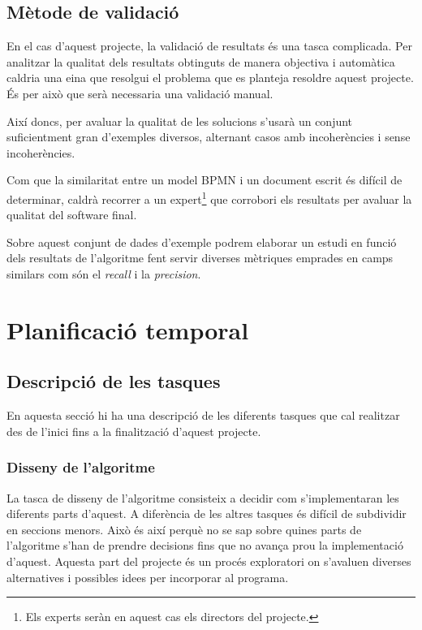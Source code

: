 \documentclass[10pt,a4paper]{article}
\begin{document}
\subsection{Mètode de validació}

En el cas d'aquest projecte, la validació de resultats és una tasca complicada. Per analitzar la qualitat dels resultats obtinguts de manera objectiva i automàtica caldria una eina que resolgui el problema que es planteja resoldre aquest projecte. És per això que serà necessaria una validació manual.

Així doncs, per avaluar la qualitat de les solucions s'usarà un conjunt suficientment gran d'exemples diversos, alternant casos amb incoherències i sense incoherències. 

Com que la similaritat entre un model BPMN i un document escrit és difícil de determinar, caldrà recorrer a un expert\footnote{Els experts seràn en aquest cas els directors del projecte.} que corrobori els resultats per avaluar la qualitat del software final.

Sobre aquest conjunt de dades d'exemple podrem elaborar un estudi en funció dels resultats de l'algoritme fent servir diverses mètriques emprades en camps similars com són el \emph{recall} i la \emph{precision}.


\clearpage


\section{Planificació temporal}

\subsection{Descripció de les tasques}
\label{descripcio_tasques}

En aquesta secció hi ha una descripció de les diferents tasques que cal realitzar des de l'inici fins a la finalització d'aquest projecte.

\subsubsection{Disseny de l'algoritme}

La tasca de disseny de l'algoritme consisteix a decidir com s'implementaran les diferents parts d'aquest. A diferència de les altres tasques és difícil de subdividir en seccions menors. Això és així perquè no se sap sobre quines parts de l'algoritme s'han de prendre decisions fins que no avança prou la implementació d'aquest. Aquesta part del projecte és un procés exploratori on s'avaluen diverses alternatives i possibles idees per incorporar al programa.
\end{document}
